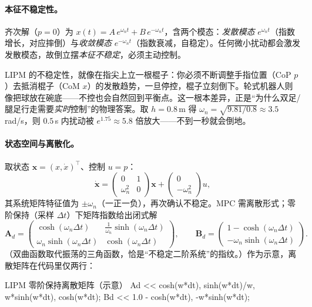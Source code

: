 \paragraph{本征不稳定性。}
齐次解（$p=0$）为 $x(t)=A\,e^{\omega_n t}+B\,e^{-\omega_n t}$，含两个模态：\emph{发散模态} $e^{\omega_n t}$（指数增长，对应摔倒）与\emph{收敛模态} $e^{-\omega_n t}$（指数衰减，自稳定）。任何微小扰动都会激发发散模态，故倒立摆\emph{本征不稳定}，必须主动控制。

\begin{insight}
LIPM 的不稳定性，就像在指尖上立一根棍子：你必须不断调整手指位置（CoP $p$）去抵消棍子（CoM $x$）的发散趋势，一旦停控，棍子立刻倒下。轮式机器人则像把球放在碗底——不控也会自然回到平衡点。这一根本差异，正是“为什么双足/腿足行走需要\emph{实时}控制”的物理答案。取 $h=0.8$\,m 得 $\omega_n=\sqrt{9.81/0.8}\approx 3.5$\,rad/s，则 $0.5$\,s 内扰动被 $e^{1.75}\approx 5.8$ 倍放大——不到一秒就会倒地。
\end{insight}

\paragraph{状态空间与离散化。}
取状态 $\mathbf{x}=(x,\dot{x})^\top$、控制 $u=p$：
\begin{equation}
  \dot{\mathbf{x}}=\begin{pmatrix}0&1\\\omega_n^2&0\end{pmatrix}\mathbf{x}
  +\begin{pmatrix}0\\-\omega_n^2\end{pmatrix}u,
  \label{eq:rm-lipm-ss}
\end{equation}
其系统矩阵特征值为 $\pm\omega_n$（一正一负），再次确认不稳定。MPC 需离散形式；零阶保持（采样 $\Delta t$）下矩阵指数给出闭式解
\begin{equation}
  \mathbf{A}_d=\begin{pmatrix}\cosh(\omega_n\Delta t)&\tfrac{1}{\omega_n}\sinh(\omega_n\Delta t)\\[2pt]
  \omega_n\sinh(\omega_n\Delta t)&\cosh(\omega_n\Delta t)\end{pmatrix},\qquad
  \mathbf{B}_d=\begin{pmatrix}1-\cosh(\omega_n\Delta t)\\-\omega_n\sinh(\omega_n\Delta t)\end{pmatrix}.
  \label{eq:rm-lipm-disc}
\end{equation}
（双曲函数取代振荡的三角函数，恰是“不稳定二阶系统”的指纹。）作为示意，离散矩阵在代码里仅两行：
\begin{codebox}[C++]{LIPM 零阶保持离散矩阵（示意）}
Ad << cosh(w*dt), sinh(w*dt)/w,  w*sinh(w*dt), cosh(w*dt);
Bd << 1.0 - cosh(w*dt),          -w*sinh(w*dt);
\end{codebox}


